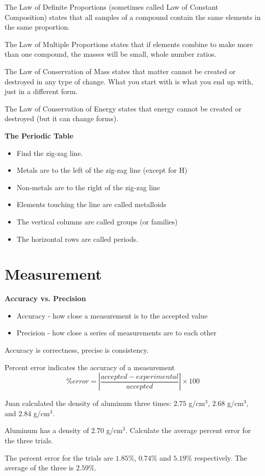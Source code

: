 \documentclass[../hchem.tex]{subfiles}
\begin{document}
The Law of Definite Proportions (sometimes called Law of Constant Composition) states that all samples of a compound 
contain the same elements in the same proportion.

The Law of Multiple Proportions states that if elements combine to make more than one compound, the masses will be small, whole number ratios.

The Law of Conservation of Mass states that matter cannot be created or destroyed in any type of change. What you start with is what you end up with, just in a different form.

The Law of Conservation of Energy states that energy cannot be created or destroyed (but it can change forms).

\textbf{The Periodic Table}
\begin{itemize}
    \item Find the zig-zag line.
    \item Metals are to the left of the zig-zag line (except for H)
    \item Non-metals are to the right of the zig-zag line
    \item Elements touching the line are called metalloids
    \item The vertical columns are called groups (or families)
    \item The horizontal rows are called periods.
\end{itemize}

\section{Measurement}
\textbf{Accuracy vs. Precision}
\begin{itemize}
    \item Accuracy - how close a measurement is to the accepted value 
    \item Precision - how close a series of measurements are to each other 
\end{itemize}
Accuracy is correctness, precise is consistency.

Percent error indicates the accuracy of a measurement 
\[ \%error= \left|\frac{accepted-experimental}{accepted}\right|\times 100 \]

\begin{example}
    Juan calculated the density of aluminum three times: $2.75$ g/cm$^3$, $2.68$ g/cm$^3$, and $2.84$ g/cm$^3$. 

    Aluminum has a density of $2.70$ g/cm$^3$. Calculate the average percent error for the three trials.

    The percent error for the trials are $1.85\%$, $0.74\%$ and $5.19\%$ respectively. The average of the three is $2.59\%$.
\end{example}
\end{document}
